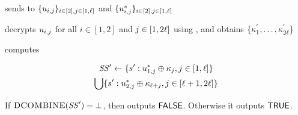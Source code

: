 \begin{algorithm}
\begin{algorithmic}[1]
\State \client sends to \server $\{\secretShareEncryption{\tblIdx,\projIdx}\}_{\tblIdx \in [2], \projIdx \in [1, \genericVecLen]}$ and $\{\secretShareEncryption{\tblIdx,\projIdx}^{\ast}\}_{\tblIdx \in [2], \projIdx \in [1, \genericVecLen]}$


\Statex {}


\State \server decrypts $\secretShareEncryption{i, \projIdx}$ for all $i \in [1,2]$ and $j \in [1,2\ell]$ using \encryptPrivKey, and obtains $\{ \kappa^{'}_{1}, \dots, \kappa^{'}_{2\ell} \}$

\State \server computes 

\begin{multline*}
\ssSet' \assign \{ s': \secretShareEncryption{1, \projIdx}^{\ast} \oplus \prgSeed{\projIdx}, \projIdx \in [1, \genericVecLen]\} \\
\bigcup \{ s': \secretShareEncryption{2, \projIdx}^{\ast} \oplus \prgSeed{\genericVecLen + \projIdx}, \projIdx \in [\genericVecLen + 1, 2\genericVecLen] \}
\end{multline*}


\State If $\textsc{DCOMBINE}(\mathit{SS}') = \bot$, then \server outputs $\mathsf{FALSE}$. Otherwise it outputs $\mathsf{TRUE}$. 



\EndProcedure




\end{algorithmic}
\end{algorithm}






